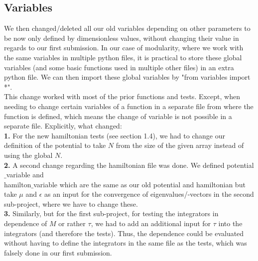 \documentclass[11pt, letterpaper, onecolumn]{article}
\begin{document}
\subsection{Variables}
	We then changed/deleted all our old variables depending on other parameters to be now only defined by dimensionless values, without changing their value in regards to our first submission. In our case of modularity, where we work with the same variables in multiple python files, it is practical to store these global variables (and some basic functions used in multiple other files) in an extra python file. We can then import these global variables by "from variables import *". \\
	This change worked with most of the prior functions and tests. Except, when needing to change certain variables of a function in a separate file from where the function is defined, which means the change of variable is not possible in a separate file. Explicitly, what changed: \\
	\textbf{1.} For the new hamiltonian tests (see section 1.4), we had to change our definition of the potential to take $N$ from the size of the given array instead of using the global $N$.\\
	\textbf{2.} A second change regarding the hamiltonian file was done. We defined potential$\_$variable and \\hamilton$\_$variable which are the same as our old potential and hamiltonian but take $\mu$ and $\epsilon$ as an input for the convergence of eigenvalues/-vectors in the second sub-project, where we have to change these.\\
	\textbf{3.} Similarly, but for the first sub-project, for testing the integrators in dependence of $M$ or rather $\tau$, we had to add an additional input for $\tau$ into the integrators (and therefore the tests). Thus, the dependence could be evaluated without having to define the integrators in the same file as the tests, which was falsely done in our first submission.
\end{document}
